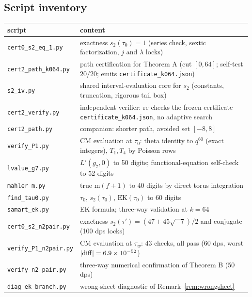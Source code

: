 \documentclass[11pt]{article}
\theoremstyle{definition}
\theoremstyle{remark}
\newcommand{\m}{\mathrm{m}}
\begin{document}
\subsection{Script inventory}\label{subsec:scripts}

\begin{center}\footnotesize
\begin{tabular}{lp{9.2cm}}
\toprule
script & content \\
\midrule
\texttt{cert0\_s2\_eq\_1.py} & exactness $s_2(\tau_0)=1$ (series check,
  sextic factorization, $j$ and $\lambda$ locks) \\
\texttt{cert2\_path\_k064.py} & path certification for Theorem A
  (cut $[0,64]$; self-test $20/20$; emits
  \texttt{certificate\_k064.json}) \\
\texttt{s2\_iv.py} & shared interval-evaluation core for $s_2$
  (constants, truncation, rigorous tail box) \\
\texttt{cert2\_verify.py} & independent verifier: re-checks the frozen
  certificate \texttt{certificate\_k064.json}, no adaptive search \\
\texttt{cert2\_path.py} & companion: shorter path, avoided set $[-8,8]$ \\
\texttt{verify\_P1.py} & CM evaluation at $\tau_0$: theta identity to $q^{60}$
  (exact integers), $T_1,T_4$ by Poisson rows \\
\texttt{lvalue\_g7.py} & $L'(g_7,0)$ to 50 digits; functional-equation
  self-check to 52 digits \\
\texttt{mahler\_m.py} & true $\m(f+1)$ to 40 digits by direct torus
  integration \\
\texttt{find\_tau0.py} & $\tau_0$, $s_2(\tau_0)$, $\mathrm{EK}(\tau_0)$
  to 60 digits \\
\texttt{samart\_ek.py} & EK formula; three-way validation at $k=64$ \\
\texttt{cert0\_s2\_n2pair.py} & exactness $s_2(\tau')=(47+45\sqrt{-7})/2$
  and conjugate (100 dps locks) \\
\texttt{verify\_P1\_n2pair.py} & CM evaluation at $\tau_w$: 43 checks, all pass
  (60 dps, worst $|{\rm diff}|=6.9\times10^{-52}$) \\
\texttt{verify\_n2\_pair.py} & three-way numerical confirmation of
  Theorem B (50 dps) \\
\texttt{diag\_ek\_branch.py} & wrong-sheet diagnostic of
  Remark~\ref{rem:wrongsheet} \\
\bottomrule
\end{tabular}
\end{center}
\end{document}
